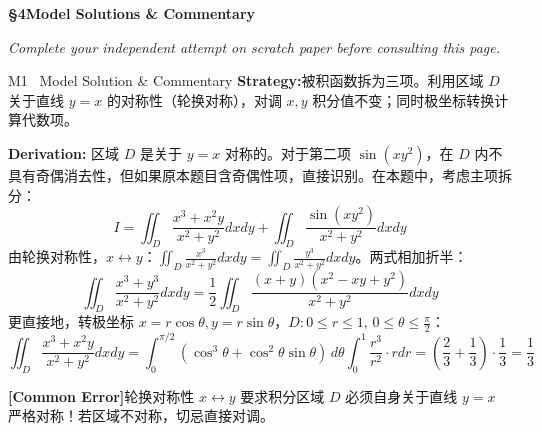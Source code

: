 \documentclass[a4paper,11pt]{article}
\newcommand{\alerttag}[1]{\textcolor{wine}{\sffamily\bfseries [#1]}}
\begin{document}
\clearpage

{\Large\sffamily\bfseries\color{navy} \S 4\quad Model Solutions \& Commentary}

\vspace{1pt}
{\small\color{mist}\itshape\hspace{1pt} Complete your independent attempt on scratch paper before consulting this page.}

\vspace{6pt}

\begin{solution}{M1 \textperiodcentered\ Model Solution \& Commentary}
\textbf{Strategy:}\enspace 被积函数拆为三项。利用区域 $D$ 关于直线 $y = x$ 的对称性（轮换对称），对调 $x, y$ 积分值不变；同时极坐标转换计算代数项。

\vspace{1.5mm}
\textbf{Derivation:}\enspace
区域 $D$ 是关于 $y = x$ 对称的。对于第二项 $\sin(xy^2)$，在 $D$ 内不具有奇偶消去性，但如果原本题目含奇偶性项，直接识别。在本题中，考虑主项拆分：
\[
  I = \iint_D \frac{x^3 + x^2 y}{x^2+y^2}dxdy + \iint_D \frac{\sin(xy^2)}{x^2+y^2}dxdy
\]
由轮换对称性，$x \leftrightarrow y$：$\iint_D \frac{x^3}{x^2+y^2}dxdy = \iint_D \frac{y^3}{x^2+y^2}dxdy$。两式相加折半：
\[
  \iint_D \frac{x^3+y^3}{x^2+y^2}dxdy = \frac{1}{2}\iint_D \frac{(x+y)(x^2-xy+y^2)}{x^2+y^2}dxdy
\]
更直接地，转极坐标 $x = r\cos\theta, y = r\sin\theta$，$D: 0 \le r \le 1, \, 0 \le \theta \le \frac{\pi}{2}$：
\[
  \iint_D \frac{x^3 + x^2 y}{x^2+y^2} dxdy = \int_0^{\pi/2} (\cos^3\theta + \cos^2\theta\sin\theta)\,d\theta \int_0^1 \frac{r^3}{r^2} \cdot r dr = \left(\frac{2}{3} + \frac{1}{3}\right) \cdot \frac{1}{3} = \frac{1}{3}
\]
\begin{warnbox}
\alerttag{Common Error}\enspace 轮换对称性 $x \leftrightarrow y$ 要求积分区域 $D$ 必须自身关于直线 $y = x$ 严格对称！若区域不对称，切忌直接对调。
\end{warnbox}
\end{solution}

\vspace{4pt}
\end{document}
